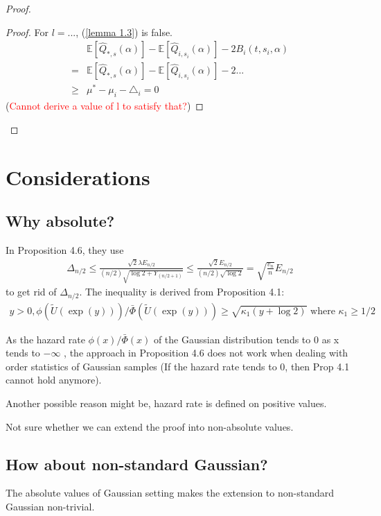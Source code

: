 \documentclass{article}
\theoremstyle{plain}
\begin{document}
\begin{proof}
\begin{proof}
    For $l = ...$, (\ref{lemma 1.3}) is false.
    \begin{align}
        & \mathbb{E}[\hat{Q}_{*, s}(\alpha)] - \mathbb{E}[\hat{Q}_{i, s_i}(\alpha)] - 2 B_i(t, s_i, \alpha) \\
        = &\mathbb{E}[\hat{Q}_{*, s}(\alpha)] - \mathbb{E}[\hat{Q}_{i, s_i}(\alpha)] - 2 ... \\
        \geq & \mu^\ast - \mu_i - \triangle_i = 0
    \end{align}
    (\textcolor{red}{Cannot derive a value of l to satisfy that?})
\end{proof}
   
\end{proof}

\section{Considerations}

\subsection{Why absolute?}

In \cite{boucheron2012} Proposition 4.6,  they use
\begin{align}
    \Delta_{n / 2} \leq \frac{\sqrt{2} \lambda E_{n / 2}}{(n / 2) \sqrt{\log 2+Y_{(n / 2+1)}}} \leq \frac{\sqrt{2} E_{n / 2}}{(n / 2) \sqrt{\log 2}}=\sqrt{\frac{v_{n}}{n}} E_{n / 2}
\end{align}
to get rid of $\Delta_{n/2}$. 
The inequality is derived from \cite{boucheron2012} Proposition 4.1: 
\begin{align}
    y>0, \phi(\tilde{U}(\exp (y))) / \bar{\Phi}(\tilde{U}(\exp (y))) \geq \sqrt{\kappa_{1}(y+\log 2)} \text { where } \kappa_{1} \geq 1 / 2
\end{align} 

As the hazard rate $\phi(x) / \bar{\Phi}(x)$ of the Gaussian distribution tends to 0 as x tends to $- \infty$ , the approach in  \cite{boucheron2012} Proposition 4.6 does not work when dealing with order statistics of Gaussian samples (If the hazard rate tends to 0, then Prop 4.1 cannot hold anymore).

Another possible reason might be, hazard rate is defined on positive values.

Not sure whether we can extend the proof into non-absolute values.

\subsection{How about non-standard Gaussian?}
The absolute values of Gaussian setting makes the extension to non-standard Gaussian non-trivial. 
\end{document}
